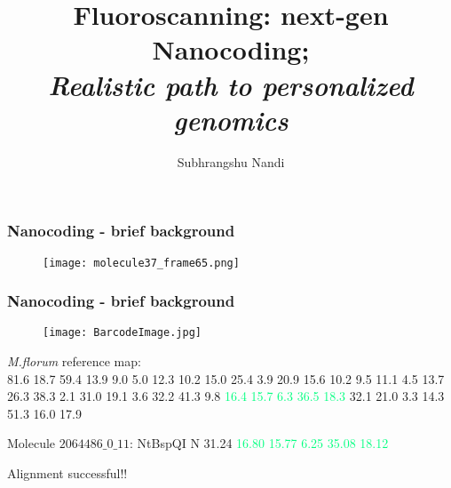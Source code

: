 \documentclass[10pt,dvipsnames,table]{beamer}
\title[Fluoroscanning: next generation nanocoding]{Fluoroscanning: next-gen Nanocoding; \\ {\emph{Realistic path to personalized genomics}}}
\author{Subhrangshu Nandi}
\begin{document}
\setlength{\baselineskip}{16truept}
\frame{\maketitle}



\begin{frame}
\frametitle{Nanocoding - brief background}
\begin{figure}[T]
\texttt{[image: molecule37\_frame65.png]}
\end{figure}
\end{frame}

\begin{frame}
\frametitle{Nanocoding - brief background}
\begin{figure}[T]
\texttt{[image: BarcodeImage.jpg]}
\end{figure}

{\emph{M.florum}} reference map: \\
81.6 18.7 59.4 13.9 9.0 5.0 12.3 10.2 15.0 25.4 3.9 20.9 15.6 10.2 9.5 11.1 4.5 
13.7 26.3 38.3 2.1 31.0 19.1 3.6 32.2 41.3 9.8 \textcolor<3>{SpringGreen}{16.4 15.7 6.3 36.5 18.3} 32.1 21.0 
3.3 14.3 51.3 16.0 17.9

\pause
Molecule $2064486\_0\_11$: NtBspQI N  31.24  \textcolor<3>{SpringGreen}{16.80  15.77  6.25  35.08  18.12}

Alignment successful!!
\end{frame}
\end{document}
